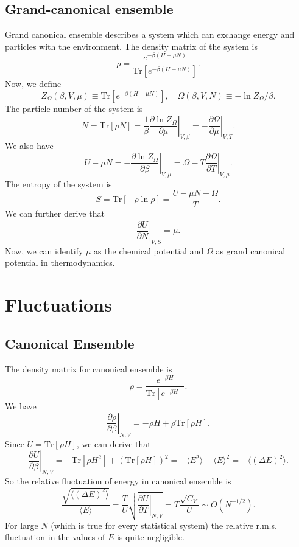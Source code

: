 \subsection{Grand-canonical ensemble}
Grand canonical ensemble describes a system which can exchange energy and particles with the environment. The density matrix of the system is
\[\rho = \frac{e^{-\beta (H - \mu N)}}{\mathrm{Tr}[e^{-\beta (H - \mu N)}]}.\]
Now, we define
\[Z_{\Omega}(\beta,V,\mu) \equiv \mathrm{Tr}[e^{-\beta (H-\mu N)}] , \quad \Omega(\beta,V,N) \equiv -\ln Z_{\Omega}/\beta.\]
The particle number of the system is
\[N = \mathrm{Tr}[\rho N] = \frac{1}{\beta}\left. \frac{\partial \ln Z_{\Omega}}{\partial \mu} \right|_{V,\beta} = -\left. \frac{\partial \Omega}{\partial \mu} \right|_{V,T}.\]
We also have
\[U - \mu N = -\left. \frac{\partial \ln Z_{\Omega}}{\partial \beta} \right|_{V,\mu} = \Omega - T\left. \frac{\partial \Omega}{\partial T} \right|_{V,\mu} .\]
The entropy of the system is
\[S = \mathrm{Tr}[-\rho\ln\rho] = \frac{U-\mu N - \Omega}{T}.\]
We can further derive that
\[\left. \frac{\partial U}{\partial N}\right|_{V,S} = \mu.\]
Now, we can identify $\mu$ as the chemical potential and $\Omega$ as grand canonical potential in thermodynamics.

\section{Fluctuations}
\subsection{Canonical Ensemble}
The density matrix for canonical ensemble is
\[\rho = \frac{e^{-\beta H}}{\mathrm{Tr}[e^{-\beta H}]}.\]
We have
\[\left. \frac{\partial \rho}{\partial \beta} \right|_{N,V} = -\rho H + \rho \mathrm{Tr}[\rho H].\]
Since $U = \mathrm{Tr}[\rho H]$, we can derive that
\[\left. \frac{\partial U}{\partial \beta} \right|_{N,V} = -\mathrm{Tr}[\rho H^2] + (\mathrm{Tr}[\rho H])^2 = -\langle E^2 \rangle + \langle E \rangle^2 = -\langle (\Delta E)^2 \rangle.\]
So the relative fluctuation of energy in canonical ensemble is
\[\frac{\sqrt{\langle (\Delta E)^2 \rangle}}{\langle E \rangle} = \frac{T}{U}\sqrt{\left. \frac{\partial U}{\partial T} \right|_{N,V}} = T \frac{\sqrt{C_V}}{U} \sim O(N^{-1/2}).\]
For large $N$ (which is true for every statistical system) the relative r.m.s. fluctuation in the values of $E$ is quite negligible.

